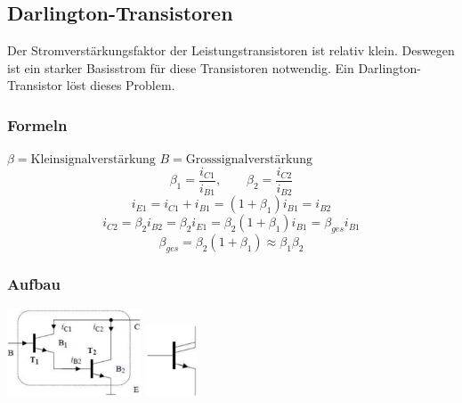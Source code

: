 \subsection{Darlington-Transistoren}
Der Stromverstärkungsfaktor der Leistungstransistoren ist relativ klein. Deswegen ist ein starker Basisstrom für diese Transistoren notwendig. Ein Darlington-Transistor löst dieses Problem.\\[0.1cm]
\begin{minipage}{0.6\linewidth}
    \subsubsection{Formeln}
    \vspace{-0.2cm}
    $ \beta = \text{Kleinsignalverstärkung}$\newline
    $B = \text{Grosssignalverstärkung}$
    \vspace{-0.2cm}
    \[ \beta_1 = \dfrac{i_{C1}}{i_{B1}}, \qquad \beta_2 = \dfrac{i_{C2}}{i_{B2}} \]    
    \[ i_{E1} = i_{C1}+i_{B1}=(1+\beta_1)i_{B1} = i_{B2} \]
    \[ i_{C2} = \beta_2 i_{B2} = \beta_2 i_{E1} = \beta_2 (1 + \beta_1)i_{B1}=\beta_{ges}i_{B1} \]
    \[ \beta_{ges} = \beta_2(1 + \beta_1) \approx \beta_1 \beta_2 \]    
\end{minipage}
\begin{minipage}{0.3\linewidth}
    \subsubsection{Aufbau}
    \includegraphics[width=4cm]{images/darlingtonaufbau}
     \includegraphics[width=1.5cm]{images/darlingtonSymbol}
\end{minipage}
 \vspace{-0.2cm}
